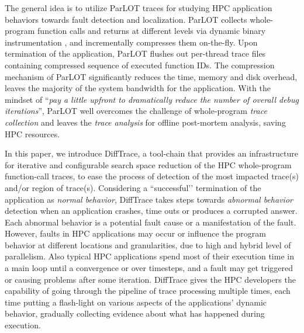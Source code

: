 The general idea is to utilize ParLOT \cite{ parlot} traces for studying HPC application behaviors towards fault detection and localization.
%
ParLOT collects whole-program function calls and returns at different levels via dynamic binary instrumentation \cite{pin}, and incrementally compresses them on-the-fly.
%
Upon termination of the application, ParLOT flushes out per-thread trace files containing compressed sequence of executed function IDs.
%
The compression mechanism of ParLOT significantly reduces the time, memory and disk overhead, leaves the majority of the system bandwidth for the application. 
%
With the mindset of ``\textit{pay a little upfront to dramatically reduce the number of overall debug iterations}'', ParLOT well overcomes the challenge of whole-program \textit{trace collection} and leaves the \textit{trace analysis} for offline post-mortem analysis, saving HPC resources.
%

In this paper, we introduce DiffTrace, a tool-chain that provides an infrastructure for iterative and configurable search space reduction of the HPC whole-program function-call traces, to ease the process of detection of the most impacted trace(s) and/or region of trace(s).
%
Considering a ``successful’’ termination of the application as \textit{normal behavior}, DiffTrace takes steps towards \textit{abnormal behavior} detection when an application crashes, time outs or produces a corrupted answer.
%
Each abnormal behavior is a potential fault cause or a manifestation of the fault.
%
However, faults in HPC applications may occur or influence the program behavior at different locations and granularities, due to high and hybrid level of parallelism.
%
Also typical HPC applications spend most of their execution time in a main loop until a convergence or over timesteps, and a fault may get  triggered or causing problems after some iteration.
%
DiffTrace gives the HPC developers the capability of going through the pipeline of trace processing multiple times, each time putting a flash-light on various aspects of the applications' dynamic behavior, gradually collecting evidence about what has happened during execution.
%



